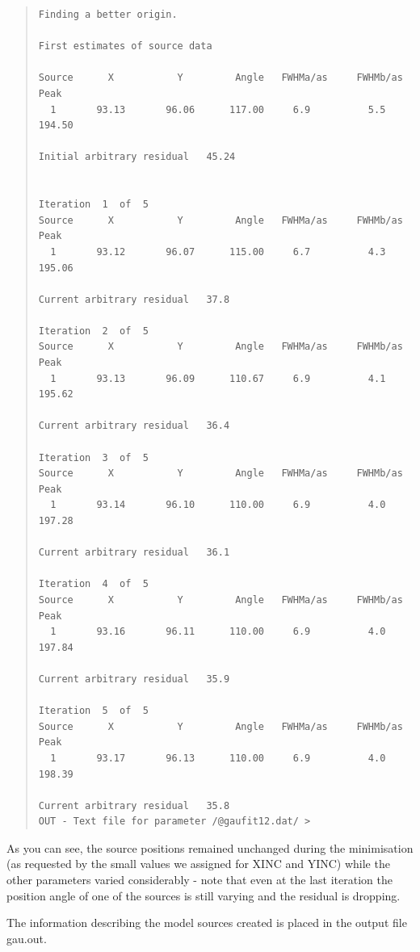 \documentclass[twoside,11pt]{article}
\newenvironment{myquote}{\begin{quote}\begin{small}}{\end{small}\end{quote}}
\begin{document}
 
\begin{myquote}
\begin{verbatim}
Finding a better origin.
 
First estimates of source data

Source      X           Y         Angle   FWHMa/as     FWHMb/as         Peak
  1       93.13       96.06      117.00     6.9          5.5           194.50

Initial arbitrary residual   45.24


Iteration  1  of  5
Source      X           Y         Angle   FWHMa/as     FWHMb/as         Peak
  1       93.12       96.07      115.00     6.7          4.3           195.06

Current arbitrary residual   37.8

Iteration  2  of  5
Source      X           Y         Angle   FWHMa/as     FWHMb/as         Peak
  1       93.13       96.09      110.67     6.9          4.1           195.62

Current arbitrary residual   36.4

Iteration  3  of  5
Source      X           Y         Angle   FWHMa/as     FWHMb/as         Peak
  1       93.14       96.10      110.00     6.9          4.0           197.28

Current arbitrary residual   36.1

Iteration  4  of  5
Source      X           Y         Angle   FWHMa/as     FWHMb/as         Peak
  1       93.16       96.11      110.00     6.9          4.0           197.84

Current arbitrary residual   35.9

Iteration  5  of  5
Source      X           Y         Angle   FWHMa/as     FWHMb/as         Peak
  1       93.17       96.13      110.00     6.9          4.0           198.39

Current arbitrary residual   35.8
OUT - Text file for parameter /@gaufit12.dat/ >

\end{verbatim}
\end{myquote}

As you can see, the source positions remained unchanged during the minimisation
(as requested by the small values we assigned for XINC and YINC) while
the other parameters varied considerably -  note that even at the last 
iteration the position angle of one of the sources is still varying and the
residual is dropping. 

The information describing the model 
sources created is placed in the output file gau.out.  
\end{document}
